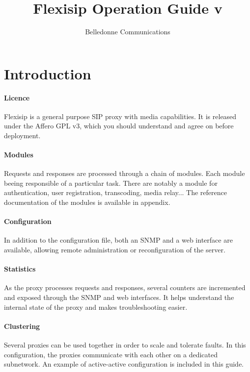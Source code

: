 \documentclass[a4paper,10pt]{article}
\title{Flexisip Operation Guide v\flexisipversion}
\author{Belledonne Communications}
\begin{document}
\maketitle
\newpage


\tableofcontents
\newpage


{}
\section*{Introduction}
\paragraph{Licence}
Flexisip is a general purpose SIP proxy with media capabilities.
It is released under the Affero GPL v3, which you should understand and agree on before deployment.

\paragraph{Modules}
Requests and responses are processed through a chain of modules. Each module beeing responsible of a particular task.
There are notably a module for authentication, user registration, transcoding, media relay...
The reference documentation of the modules is available in appendix.

\paragraph{Configuration}
In addition to the configuration file, both an SNMP and a web interface are available, allowing remote administration 
or reconfiguration of the server.

\paragraph{Statistics}
As the proxy processes requests and responses, several counters are incremented and exposed through the SNMP and web interfaces.
It helps understand the internal state of the proxy and makes troubleshooting easier.

\paragraph{Clustering}
Several proxies can be used together in order to scale and tolerate faults.
In this configuration, the proxies communicate with each other on a dedicated subnetwork.
An example of active-active configuration is included in this guide.
\end{document}
